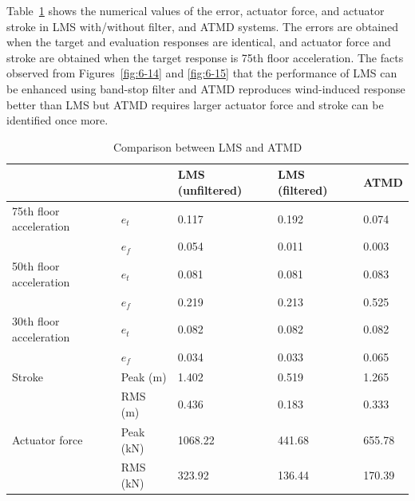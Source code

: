 Table~\ref{tab:6-2} shows the numerical values of the error, actuator force, and actuator stroke in LMS with/without filter, and ATMD systems. The errors are obtained when the target and evaluation responses are identical, and actuator force and stroke are obtained when the target response is 75th floor acceleration. The facts observed from Figures~\ref{fig:6-14} and \ref{fig:6-15} that the performance of LMS can be enhanced using band-stop filter and ATMD reproduces wind-induced response better than LMS but ATMD requires larger actuator force and stroke can be identified once more.

\begin{table}[ht]
\centering
\begin{tabularx}{\textwidth}{@{}XX|X|X|X@{}}
\toprule[1pt]\midrule[0.3pt]
&& LMS (unfiltered) & LMS (filtered) & ATMD \\ \hline
75th floor acceleration & $e_{t}$ & 0.117 & 0.192 & 0.074 \\
& $e_{f}$ & 0.054 & 0.011 & 0.003 \\ \hline
50th floor acceleration & $e_{t}$ & 0.081 & 0.081 & 0.083 \\
& $e_{f}$ & 0.219 & 0.213 & 0.525 \\ \hline
30th floor acceleration & $e_{t}$ & 0.082 & 0.082 & 0.082 \\
& $e_{f}$ & 0.034 & 0.033 & 0.065 \\ \hline
Stroke & Peak (m) & 1.402 & 0.519 & 1.265 \\
& RMS (m) & 0.436 & 0.183 & 0.333 \\ \hline
Actuator force & Peak (kN) & 1068.22 & 441.68 & 655.78 \\
& RMS (kN) & 323.92 & 136.44 & 170.39 \\
\bottomrule
\end{tabularx}
\caption{Comparison between LMS and ATMD}
\label{tab:6-2}
\end{table}

